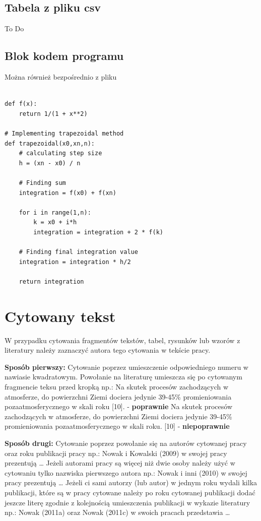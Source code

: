 \subsection{Tabela z pliku csv}
To Do

\subsection{Blok kodem programu }
Można również bezpośrednio z pliku %
\begin{verbatim}

def f(x):
    return 1/(1 + x**2)

# Implementing trapezoidal method
def trapezoidal(x0,xn,n):
    # calculating step size
    h = (xn - x0) / n
    
    # Finding sum 
    integration = f(x0) + f(xn)
    
    for i in range(1,n):
        k = x0 + i*h
        integration = integration + 2 * f(k)
    
    # Finding final integration value
    integration = integration * h/2
    
    return integration
\end{verbatim}

\section{Cytowany tekst }

W przypadku cytowania fragmentów tekstów, tabel, rysunków lub wzorów z literatury należy zaznaczyć autora tego cytowania w tekście pracy.

\textbf{Sposób pierwszy:} Cytowanie poprzez umieszczenie odpowiedniego numeru w nawiasie kwadratowym. Powołanie na literaturę umieszcza się po cytowanym fragmencie teksu przed kropką np.: Na skutek procesów zachodzących w atmosferze, do powierzchni Ziemi dociera jedynie 39-45\% promieniowania pozaatmosferycznego w skali roku [10].  - \textbf{poprawnie}
Na skutek procesów zachodzących w atmosferze, do powierzchni Ziemi dociera jedynie 39-45\% promieniowania pozaatmosferycznego w skali roku. [10]  - \textbf{niepoprawnie }

\textbf{Sposób drugi:} Cytowanie poprzez powołanie się na autorów cytowanej pracy oraz roku publikacji pracy np.: Nowak i Kowalski (2009) w swojej pracy prezentują …
Jeżeli autorami pracy są więcej niż dwie osoby należy użyć w cytowaniu tylko nazwiska pierwszego autora np.: Nowak i inni (2010) w swojej pracy prezentują …
Jeżeli ci sami autorzy (lub autor) w jednym roku wydali kilka publikacji, które są w pracy cytowane należy po roku cytowanej publikacji dodać jeszcze literę zgodnie z kolejnością umieszczenia publikacji w wykazie literatury np.: Nowak (2011a) oraz Nowak (2011c) w swoich pracach przedstawia …
